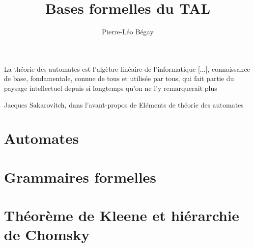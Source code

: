 \documentclass{report}
\title{Bases formelles du TAL}
\author{Pierre-Léo Bégay}
\theoremstyle{slanted}
\begin{document}
\maketitle

\epigraph{La théorie des automates est l'algèbre linéaire de l'informatique [...], connaissance de base, fondamentale, connue de tous et utilisée par tous, qui fait partie du paysage intellectuel depuis si longtemps qu'on ne l'y remarquerait plus}{Jacques Sakarovitch, dans l'avant-propos de Eléments de théorie des automates}

\tableofcontents




\chapter{Automates}
\label{automates}

\chapter{Grammaires formelles}
\label{grammaires}

\chapter{Théorème de Kleene et hiérarchie de Chomsky}
\label{hierarchie}




\appendix


\end{document}
